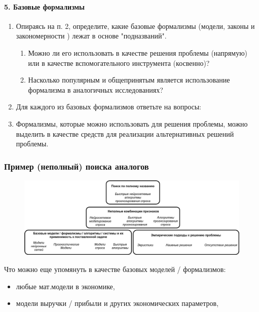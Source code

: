 \documentclass{report}
\begin{document}
\paragraph{5. Базовые формализмы}
\begin{enumerate}
	\item Опираясь на п. 2, определите, какие базовые формализмы (модели, законы и закономерности ) лежат в основе "подназваний".
		\begin{enumerate}
			\item Можно ли его использовать в качестве решения проблемы (напрямую) или в качестве вспомогательного инструмента (косвенно)?
			\item Насколько популярным и общепринятым является использование формализма в аналогичных исследованиях?
		\end{enumerate}
	\item Для каждого из базовых формализмов ответьте на вопросы:
	\item Формализмы, которые можно использовать для решения проблемы, можно выделить в качестве средств для реализации альтернативных решений проблемы.
\end{enumerate}

\subsubsection{Пример (неполный) поиска аналогов}

\begin{figure}[H]
	\centering
	\includegraphics[width=15cm]{analogs_pyramid}
\end{figure}
Что можно еще упомянуть в качестве базовых моделей / формализмов:

\begin{itemize}
	\item любые мат.модели в экономике,
	\item модели выручки / прибыли и других экономических параметров,
\end{itemize}
\end{document}
